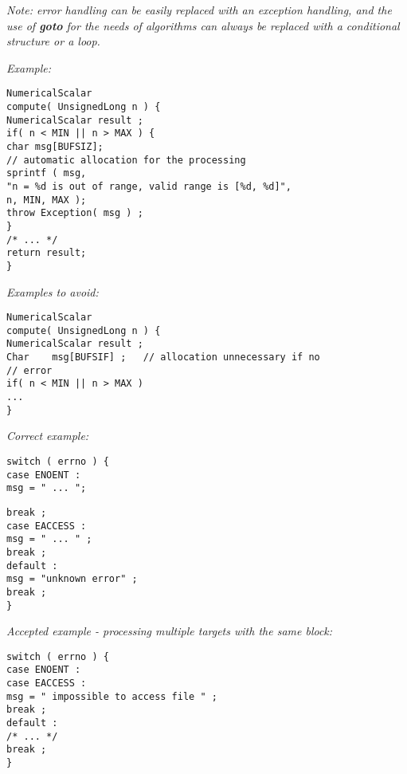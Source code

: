 \emph{Note: error handling can be easily replaced with an exception handling, and the use of {\bf goto} for the needs of algorithms can always be replaced with a conditional structure or a loop.}

\emph{Example:}
\begin{lstlisting}[frame=TBRL]
NumericalScalar
compute( UnsignedLong n ) {
NumericalScalar result ;
if( n < MIN || n > MAX ) {
char msg[BUFSIZ];
// automatic allocation for the processing
sprintf ( msg,
"n = %d is out of range, valid range is [%d, %d]",
n, MIN, MAX );
throw Exception( msg ) ;
}
/* ... */
return result;
}
\end{lstlisting}

\emph{Examples to avoid:}
\begin{lstlisting}[frame=TBRL]
NumericalScalar
compute( UnsignedLong n ) {
NumericalScalar result ;
Char    msg[BUFSIF] ;   // allocation unnecessary if no
// error
if( n < MIN || n > MAX )
...
}
\end{lstlisting}


\emph{Correct example:}
\begin{lstlisting}[frame=TRL]
switch ( errno ) {
case ENOENT :
msg = " ... ";
\end{lstlisting}
\begin{lstlisting}[frame=BRL]
break ;
case EACCESS :
msg = " ... " ;
break ;
default :
msg = "unknown error" ;
break ;
}
\end{lstlisting}

\emph{Accepted example - processing multiple targets with the same block:}
\begin{lstlisting}[frame=TBRL]
switch ( errno ) {
case ENOENT :
case EACCESS :
msg = " impossible to access file " ;
break ;
default :
/* ... */
break ;
}
\end{lstlisting}

